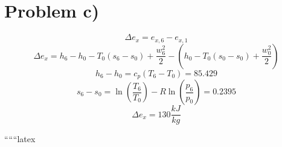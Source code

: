 \section*{Problem c)}

\[
\Delta e_x = e_{x,6} - e_{x,1}
\]
\[
\Delta e_x = h_6 - h_0 - T_0(s_6 - s_0) + \frac{w_6^2}{2} - \left( h_0 - T_0(s_0 - s_0) + \frac{w_0^2}{2} \right)
\]
\[
h_6 - h_0 = c_p(T_6 - T_0) = 85.429
\]
\[
s_6 - s_0 = \ln \left( \frac{T_6}{T_0} \right) - R \ln \left( \frac{p_6}{p_0} \right) = 0.2395
\]
\[
\Delta e_x = 130 \frac{kJ}{kg}
\]

``````latex